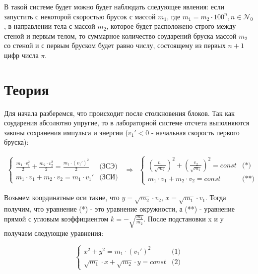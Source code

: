 \documentclass[a4paper,12pt]{article} %
\begin{document}
В такой системе будет можно будет наблюдать следующее явления: если запустить с некоторой скоростью брусок с массой $m_1$, где $m_1 = m_2 \cdot 100^n, n \in \mathcal{N}_0$, в направлении тела с массой $m_2$, которое будет расположено строго между стеной и первым телом, то суммарное количество соударений бруска массой $m_2$ со стеной и с первым бруском будет равно числу, состоящему из первых $n + 1$ цифр числа $\pi$.


\section*{Теория}
Для начала разберемся, что происходит после столкновения блоков. Так как соударения абсолютно упругие, то в лабораторной системе отсчета выполняются законы сохранения импульса и энергии \newline ($v_1' < 0$ - начальная скорость первого бруска):

\[
\begin{matrix}
    \left\{
    \begin{matrix}
        \frac{m_1 \cdot v_1^2}{2} + \frac{m_2 \cdot v_2^2}{2} = \frac{m_1 \cdot (v_1')^2}{2} &
        \mbox{(ЗСЭ)} \\
        m_1 \cdot v_1 + m_2 \cdot v_2 = m_1 \cdot v_1' &
        \mbox{(ЗСИ)}
    \end{matrix}
    & \Rightarrow &
    \left\{
    \begin{matrix}
        \left(\frac{v_1}{\sqrt{m_2}}\right)^2 + \left(\frac{v_2}{\sqrt{m_1}}\right)^2 = const &
        \mbox{(*)}
        \\
        m_1 \cdot v_1 + m_2 \cdot v_2 = const &
        \mbox{(**)}
    \end{matrix}
\end{matrix}
\]

Возьмем координатные оси такие, что $y = \sqrt{m_2} \cdot v_2$, $x = \sqrt{m_1} \cdot v_1$. Тогда получим, что уравнение (*) - это уравнение окружности, а (**) - уравнение прямой с угловым коэффициентом $k = -\sqrt{\frac{m_1}{m_2}}$. После подстановки x и y получаем следующие уравнения:

\[
    \left\{
    \begin{matrix}
        x^2 + y^2 = m_1 \cdot (v_1')^2 &
        \mbox{(1)}\\
        \sqrt{m_1} \cdot x + \sqrt{m_2} \cdot y = const &
        \mbox{(2)}
    \end{matrix}
\]
\end{document}
